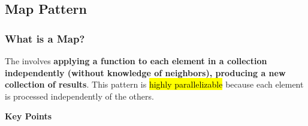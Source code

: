 \subsection{Map Pattern}\label{subsection: Map Pattern}

\subsubsection{What is a Map?}

The  involves \textbf{applying a function to each element in a collection independently (without knowledge of neighbors), producing a new collection of results}. This pattern is \hl{highly parallelizable} because each element is processed independently of the others.

\highspace
\begin{flushleft}
    \textcolor{Green3}{ \textbf{Key Points}}
\end{flushleft}
